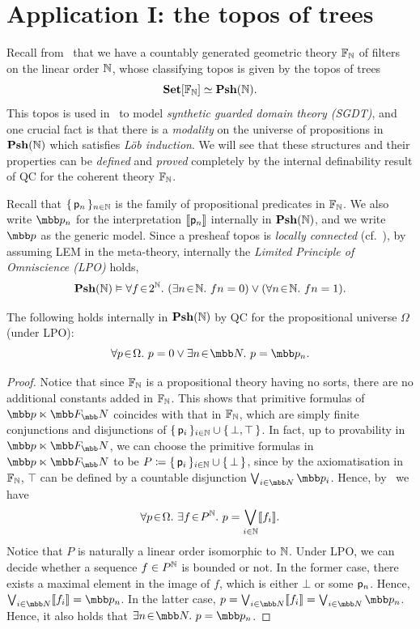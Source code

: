\section{Application I: the topos of trees}

Recall from~ that we have a countably generated geometric theory $\mathbb{F}_{\mathbb{N}}$ of filters on the linear order $\mathbb{N}$, whose classifying topos is given by the topos of trees 
\[ \mathbf{Set}[\mathbb{F}_{\mathbb{N}}] \simeq \mathbf{Psh}(\mathbb{N}). \]
This topos is used in~\citet{birkedal_first_2012} to model \emph{synthetic guarded domain theory (\gls{SGDT})}, and one crucial fact is that there is a \emph{modality} on the universe of propositions in $\mathbf{Psh}(\mathbb{N})$ which satisfies \emph{L\"ob induction}. We will see that these structures and their properties can be \emph{defined} and \emph{proved} completely by the internal definability result of \gls{QC} for the coherent theory $\mathbb{F}_{\mathbb{N}}$.

Recall that $\{\,\mathsf{p}_n\,\}_{n\in\mathbb{N}}$ is the family of propositional predicates in $\mathbb{F}_{\mathbb{N}}$. We also write $\mbb p_n$ for the interpretation $\llbracket\mathsf{p}_n\rrbracket$ internally in $\mathbf{Psh}(\mathbb{N})$, and we write $\mbb p$ as the generic model. Since a presheaf topos is \emph{locally connected} (cf.~\citet[C3.3]{johnstone2002sketches}), by assuming \gls{LEM} in the meta-theory, internally the \emph{Limited Principle of Omniscience (\gls{LPO})} holds,
\[ \mathbf{Psh}(\mathbb{N}) \vDash \forall f\!\in\!2^{\mathbb{N}}.\  (\exists n\!\in\!\mathbb{N}.\  fn = 0) \vee (\forall n\!\in\!\mathbb{N}.\  fn = 1). \]

\begin{proposition}\label{prop:qcforFN}
  The following holds internally in $\mathbf{Psh}(\mathbb{N})$ by \gls{QC} for the propositional universe $\Omega$ (under \gls{LPO}):
  \[ \fa p\Omega p = 0 \vee \ex n{\N} p = \mbb p_n. \]
\end{proposition}
\begin{proof}
  Notice that since $\mathbb{F}_{\mathbb{N}}$ is a propositional theory having no sorts, there are no additional constants added in $\mathbb{F}_{\mathbb{N}}$. This shows that primitive formulas of $\mbb p \ltimes \mbb F_\N$ coincides with that in $\mathbb{F}_{\mathbb{N}}$, which are simply finite conjunctions and disjunctions of $\{\,\mathsf{p}_i\,\}_{i\in\mathbb{N}} \cup \{\,\bot,\top\,\}$. In fact, up to provability in $\mbb p \ltimes \mbb F_\N$, we can choose the primitive formulas in $\mbb p\ltimes\mbb F_\N$ to be $P \coloneq \{\,\mathsf{p}_i\,\}_{i\in\mathbb{N}} \cup \{\,\bot\,\}$, since by the axiomatisation in $\mathbb{F}_{\mathbb{N}}$, $\top$ can be defined by a countable disjunction $\bigvee_{i\in\N}\mbb p_i$. Hence, by~ we have
  \[ \forall p\!\in\!\Omega.\  \exists f\!\in\!P^{\mathbb{N}}.\  p = \bigvee_{i\in\mathbb{N}} \llbracket f_i\rrbracket. \]
  Notice that $P$ is naturally a linear order isomorphic to $\mathbb{N}$. Under \gls{LPO}, we can decide whether a sequence $f\in P^{\mathbb{N}}$ is bounded or not. In the former case, there exists a maximal element in the image of $f$, which is either $\bot$ or some $\mathsf{p}_n$. Hence, $\bigvee_{i\in\N}\ass{f_i} = \mbb p_n$. In the latter case, $p = \bigvee_{i\in\N}\ass{f_i} = \bigvee_{i\in\N}\mbb p_n$. Hence, it also holds that $\ex n{\N} p = \mbb p_n$.
\end{proof}

